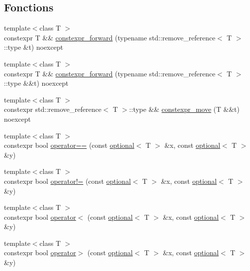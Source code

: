 \subsection*{Fonctions}
\begin{DoxyCompactItemize}
\item 
{\footnotesize template$<$class T $>$ }\\constexpr T \&\& \hyperlink{namespacestd_1_1experimental_ad6c79ef527ee25f0a6295128c4b51f89}{constexpr\+\_\+forward} (typename std\+::remove\+\_\+reference$<$ T $>$\+::type \&t) noexcept
\item 
{\footnotesize template$<$class T $>$ }\\constexpr T \&\& \hyperlink{namespacestd_1_1experimental_a9bcca6a02f6e3005b3180962429c6feb}{constexpr\+\_\+forward} (typename std\+::remove\+\_\+reference$<$ T $>$\+::type \&\&t) noexcept
\item 
{\footnotesize template$<$class T $>$ }\\constexpr std\+::remove\+\_\+reference$<$ T $>$\+::type \&\& \hyperlink{namespacestd_1_1experimental_abe16b4d69976581fbfc135b809b3ffe3}{constexpr\+\_\+move} (T \&\&t) noexcept
\item 
{\footnotesize template$<$class T $>$ }\\constexpr bool \hyperlink{namespacestd_1_1experimental_a0bd6ca198e90eb70255e0b370072f154}{operator==} (const \hyperlink{classstd_1_1experimental_1_1optional}{optional}$<$ T $>$ \&x, const \hyperlink{classstd_1_1experimental_1_1optional}{optional}$<$ T $>$ \&y)
\item 
{\footnotesize template$<$class T $>$ }\\constexpr bool \hyperlink{namespacestd_1_1experimental_abf45cbc40acb4929dbf1caa3b31460d9}{operator!=} (const \hyperlink{classstd_1_1experimental_1_1optional}{optional}$<$ T $>$ \&x, const \hyperlink{classstd_1_1experimental_1_1optional}{optional}$<$ T $>$ \&y)
\item 
{\footnotesize template$<$class T $>$ }\\constexpr bool \hyperlink{namespacestd_1_1experimental_a27caacd2780817469b565c269933185d}{operator$<$} (const \hyperlink{classstd_1_1experimental_1_1optional}{optional}$<$ T $>$ \&x, const \hyperlink{classstd_1_1experimental_1_1optional}{optional}$<$ T $>$ \&y)
\item 
{\footnotesize template$<$class T $>$ }\\constexpr bool \hyperlink{namespacestd_1_1experimental_a1d2409f0cb8fda0ec9a0b9d5e1e61cb5}{operator$>$} (const \hyperlink{classstd_1_1experimental_1_1optional}{optional}$<$ T $>$ \&x, const \hyperlink{classstd_1_1experimental_1_1optional}{optional}$<$ T $>$ \&y)

\end{DoxyCompactItemize}
